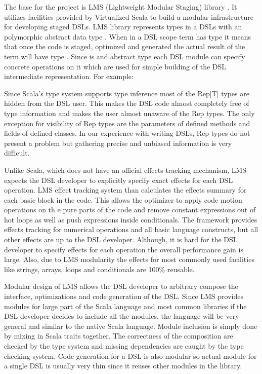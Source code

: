 The base for the \tool project is LMS (Lightweight Modular Staging) library . It utilizes facilities provided by Virtualized Scala to build a modular infrastructure for developing staged DSLs. LMS library represents types in a DSLs with an polymorphic abstract data type . When in a DSL scope term has type  it means that once the code is staged, optimized and generated the actual result of the term will have type .  Since  is and abstract type each DSL module can specify concrete operations on it which are used for simple building of the DSL intermediate representation. For example: 

 
Since Scala's type system supports type inference  most of the Rep[T] types are hidden from the DSL user. This makes the DSL code almost completely free of type information and makes the user almost unaware of the Rep types. The only exception for visibility of Rep types are the parameters of defined methods and fields of defined classes. In our experience with writing DSLs, Rep types do not present a problem but gathering precise and unbiased information is very difficult. 

Unlike Scala, which does not have an official effects tracking mechanism, LMS expects the DSL developer to explicitly specify exact effects for each DSL operation. LMS effect tracking system than calculates the effects summary for each basic block in the code. This allows the optimizer to apply code motion operations on th e pure parts of the code and remove constant expressions out of hot loops as well as push expressions inside conditionals. The framework provides effects tracking for numerical operations and all basic language constructs, but all other effects are up to the DSL developer. Although, it is hard for the DSL developer to specify effects for each operation the overall performance gain is large. Also, due to LMS modularity the effects for most commonly used facilities like strings, arrays, loops and conditionals are 100\% reusable.


Modular design of LMS allows the DSL developer to arbitrary compose the interface, optimizations and code generation of the DSL. Since LMS provides modules for large part of the Scala language and most common libraries if the DSL developer decides to include all the modules, the language will be very general and similar to the native Scala language. Module inclusion is simply done by mixing in Scala traits together. The correctness of the composition are checked by the type system and missing dependencies are caught by the type checking system. Code generation for a DSL is also modular so actual module for a single DSL is usually very thin since it reuses other modules in the library.
